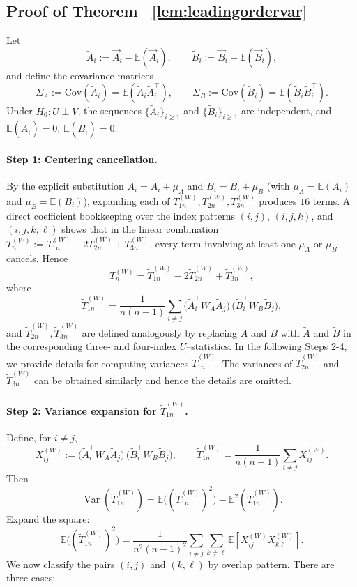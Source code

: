 \documentclass[12pt,reqno,oneside]{amsbook}
\theoremstyle{definition}
\theoremstyle{remark}
\DeclareMathOperator{\Var}{Var}
\begin{document}
\subsection{Proof of Theorem ~\ref{lem:leadingordervar}}

Let
\[
\tilde A_i := \vec A_i-\mathbb E(\vec A_i),\qquad
\tilde B_i := \vec B_i-\mathbb E(\vec B_i),
\]
and define the covariance matrices
\[
\Sigma_A := \mbox{Cov}(\tilde A_i)=\mathbb E(\tilde A_i\tilde A_i^\top),\qquad
\Sigma_B := \mbox{Cov}(\tilde B_i)=\mathbb E(\tilde B_i\tilde B_i^\top).
\]
Under $H_0:U\perp V$, the sequences $\{\tilde A_i\}_{i\ge1}$ and
$\{\tilde B_i\}_{i\ge1}$ are independent, and $\mathbb E(\tilde A_i)=0$,
$\mathbb E(\tilde B_i)=0$.

\paragraph{Step 1: Centering cancellation.}
By the explicit substitution $A_i=\tilde A_i+\mu_A$ and $B_i=\tilde B_i+\mu_B$
(with $\mu_A=\mathbb E(A_i)$ and $\mu_B=\mathbb E(B_i)$), expanding each of
$T_{1n}^{(W)},T_{2n}^{(W)},T_{3n}^{(W)}$ produces $16$ terms.
A direct coefficient bookkeeping over the index patterns
$(i,j)$, $(i,j,k)$, and $(i,j,k,\ell)$ shows that in the linear combination
$T_n^{(W)}:=T_{1n}^{(W)}-2T_{2n}^{(W)}+T_{3n}^{(W)}$, every term involving at
least one $\mu_A$ or $\mu_B$ cancels. Hence
\[
T_n^{(W)}=\tilde T_{1n}^{(W)}-2\tilde T_{2n}^{(W)}+\tilde T_{3n}^{(W)},
\]
where
\[
\tilde T_{1n}^{(W)}
=
\frac{1}{n(n-1)}\sum_{i\neq j}
\bigl(\tilde A_i^\top W_A \tilde A_j\bigr)\,
\bigl(\tilde B_i^\top W_B \tilde B_j\bigr),
\]
and $\tilde T_{2n}^{(W)},\tilde T_{3n}^{(W)}$ are defined analogously by
replacing $A$ and $B$ with $\tilde A$ and $\tilde B$ in the corresponding
three- and four-index $U$--statistics. In the following Steps 2-4, we provide details for computing variances $\tilde T_{1n}^{(W)}$. The variances of $\tilde T_{2n}^{(W)}$ and $\tilde T_{3n}^{(W)}$ can be obtained similarly and hence the details are omitted.

\paragraph{Step 2: Variance expansion for $\tilde T_{1n}^{(W)}$.}
Define, for $i\neq j$,
\[
X_{ij}^{(W)}
:=
\bigl(\tilde A_i^\top W_A \tilde A_j\bigr)\,
\bigl(\tilde B_i^\top W_B \tilde B_j\bigr),
\qquad
\tilde T_{1n}^{(W)}=\frac{1}{n(n-1)}\sum_{i\neq j} X_{ij}^{(W)}.
\]
Then
\[
\Var(\tilde T_{1n}^{(W)})
=
\mathbb E\big((\tilde T_{1n}^{(W)})^2\big)
-
\mathbb E^2(\tilde T_{1n}^{(W)}).
\]
Expand the square:
\[
\mathbb E\big((\tilde T_{1n}^{(W)})^2\big)
=
\frac{1}{n^2(n-1)^2}
\sum_{i\neq j}\sum_{k\neq \ell}
\mathbb E\!\left[X_{ij}^{(W)}X_{k\ell}^{(W)}\right].
\]
We now classify the pairs $(i,j)$ and $(k,\ell)$ by overlap pattern.
There are three cases:
\end{document}
